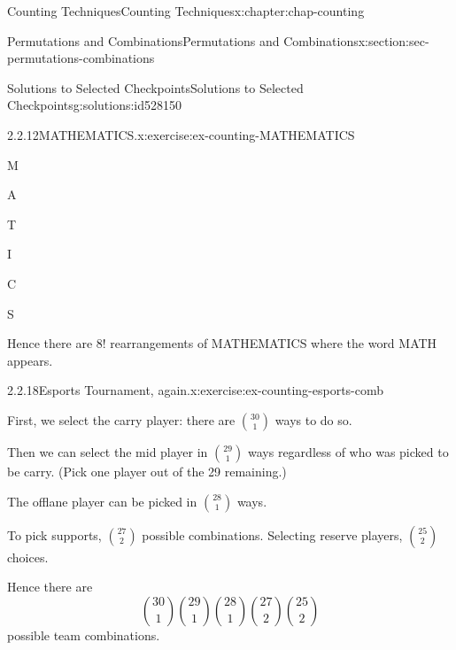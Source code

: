\documentclass[oneside,10pt,]{book}
\numberwithin{equation}{section}
\begin{document}
\begin{chapterptx}{Counting Techniques}{}{Counting Techniques}{}{}{x:chapter:chap-counting}
\begin{sectionptx}{Permutations and Combinations}{}{Permutations and Combinations}{}{}{x:section:sec-permutations-combinations}
\begin{solutions-subsection-numberless}{Solutions to Selected Checkpoints}{}{Solutions to Selected Checkpoints}{}{}{g:solutions:id528150}
\begin{inlinesolution}{2.2.12}{MATHEMATICS.}{x:exercise:ex-counting-MATHEMATICS}
\begin{sidebyside}{8}{0.02375}{0.02375}{0.0475}
\begin{sbspanel}{0.07}
M%
\end{sbspanel}%
\begin{sbspanel}{0.07}%
\par
A%
\end{sbspanel}%
\begin{sbspanel}{0.07}%
\par
T%
\end{sbspanel}%
\begin{sbspanel}{0.07}%
\par
I%
\end{sbspanel}%
\begin{sbspanel}{0.07}%
\par
C%
\end{sbspanel}%
\begin{sbspanel}{0.07}%
\par
S%
\end{sbspanel}%
\end{sidebyside}%
\par
Hence there are \(8!\) rearrangements of MATHEMATICS where the word MATH appears.%
\end{inlinesolution}%
\begin{inlinesolution}{2.2.18}{Esports Tournament, again.}{x:exercise:ex-counting-esports-comb}%
\par\smallskip%
\noindent\hypertarget{g:solution:id527932-main}{}First, we select the carry player: there are \(\displaystyle\binom{30}{1}\) ways to do so.%
\par
Then we can select the mid player in \(\displaystyle\binom{29}{1}\) ways regardless of who was picked to be carry. (Pick one player out of the 29 remaining.)%
\par
The offlane player can be picked in \(\displaystyle\binom{28}{1}\) ways.%
\par
To pick supports, \(\displaystyle\binom{27}{2}\) possible combinations. Selecting reserve players, \(\displaystyle\binom{25}{2}\) choices.%
\par
Hence there are%
\begin{equation*}
\binom{30}{1}\binom{29}{1}\binom{28}{1}\binom{27}{2}\binom{25}{2}
\end{equation*}
possible team combinations.%
\end{inlinesolution}%
\end{solutions-subsection-numberless}
\end{sectionptx}
%
%
\typeout{************************************************}
\typeout{************************************************}

\end{chapterptx}
\end{document}
